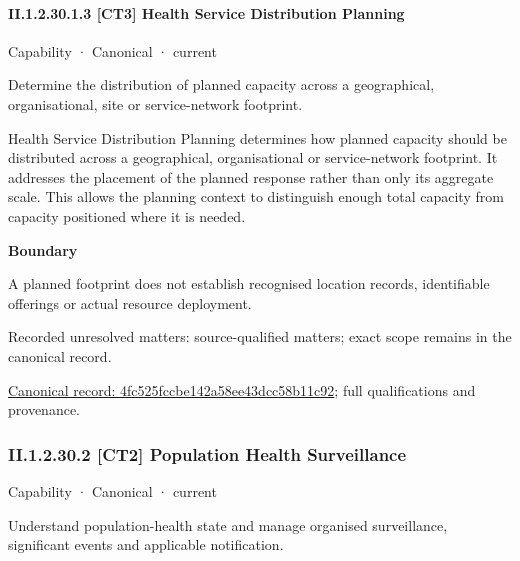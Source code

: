 \paragraph*{II.1.2.30.1.3 [CT3] Health Service Distribution Planning}
\label{navigation:II.1.2.30.1.3}

\label{element:4fc525fccbe142a58ee43dcc58b11c92}
{\small Capability · Canonical · current}\par

Determine the distribution of planned capacity across a geographical, organisational, site or service-network footprint.



Health Service Distribution Planning determines how planned capacity should be distributed across a geographical, organisational or service-network footprint. It addresses the placement of the planned response rather than only its aggregate scale. This allows the planning context to distinguish enough total capacity from capacity positioned where it is needed.



\textbf{Boundary}



A planned footprint does not establish recognised location records, identifiable offerings or actual resource deployment.


{\small Recorded unresolved matters: source-qualified matters; exact scope remains in the canonical record.}\par
{\footnotesize \href{../../../../continuum/strategy/capability/4fc525fccbe142a58ee43dcc58b11c92.md}{Canonical record: 4fc525fccbe142a58ee43dcc58b11c92}; full qualifications and provenance.}\par
\subsubsection*{II.1.2.30.2 [CT2] Population Health Surveillance}
\label{navigation:II.1.2.30.2}

\label{element:83e568fa8af14d7791a7253765ea390f}
{\small Capability · Canonical · current}\par

Understand population-health state and manage organised surveillance, significant events and applicable notification.




